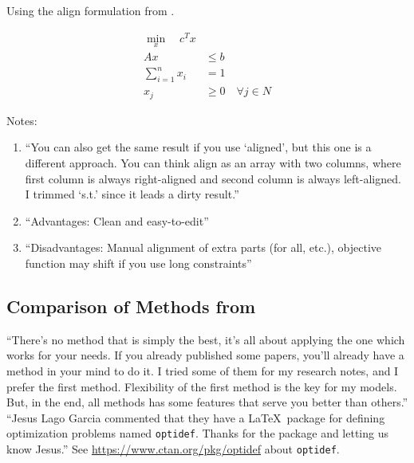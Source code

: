 \documentclass[letter,12pt]{article}
\begin{document}
Using the align formulation from \cite{Cay2013}.


\begin{align*}
\min_x \quad c^T x \\
Ax &\leq b \\
\sum_{i=1}^n x_i &= 1\\
x_j &\geq 0 \quad \forall j \in N
\end{align*}




Notes: \vspace{-0.3cm}
\begin{enumerate} \itemsep -4pt
\item ``You can also get the same result if you use `aligned', but this one is a different approach. You can think align as an array with two columns, where first column is always right-aligned and second column is always left-aligned. I trimmed `s.t.' since it leads a dirty result.''
\item ``Advantages: Clean and easy-to-edit''
\item ``Disadvantages: Manual alignment of extra parts (for all, etc.), objective function may shift if you use long constraints''
\end{enumerate}


\subsection{Comparison of Methods from \cite{Cay2013}}
\label{ssec:ComparisonOfMethodsFromCay2013}



``There's no method that is simply the best, it's all about applying the one which works for your needs. If you already published some papers, you'll already have a method in your mind to do it. I tried some of them for my research notes, and I prefer the first method. Flexibility of the first method is the key for my models. But, in the end, all methods has some features that serve you better than others.'' \\


``Jesus Lago Garcia commented that they have a \LaTeX\ package for defining optimization problems named {\tt optidef}. Thanks for the package and letting us know Jesus.'' See \url{https://www.ctan.org/pkg/optidef} about {\tt optidef}.








%
%
%

{\linespread{1}

%
%

}
%
\end{document}

